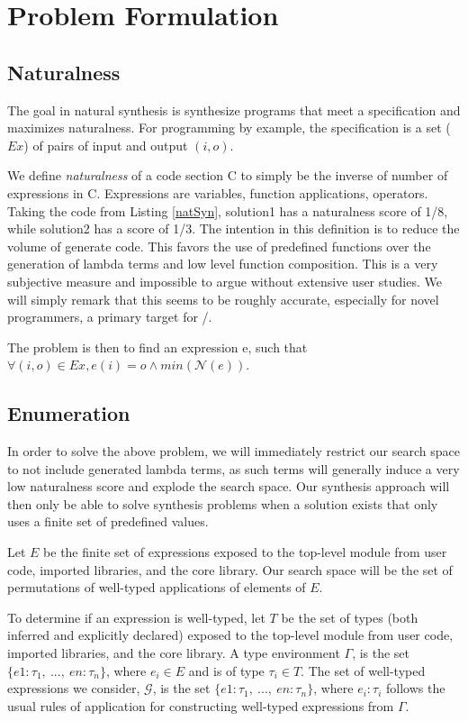 \section{Problem Formulation}
\label{problem}

\subsection{Naturalness}

The goal in natural synthesis is synthesize programs that meet a specification and maximizes naturalness.
For programming by example, the specification is a set ($Ex$) of pairs of input and output $(i,o)$.

We define \textit{naturalness} of a code section C to simply be the inverse of number of expressions in C.
Expressions are variables, function applications, operators.
Taking the code from Listing \ref{natSyn}, solution1 has a naturalness score of 1/8, while solution2 has a score of 1/3.
The intention in this definition is to reduce the volume of generate code.
This favors the use of predefined functions over the generation of lambda terms and low level function composition.
This is a very subjective measure and impossible to argue without extensive user studies.
We will simply remark that this seems to be roughly accurate, especially for novel programmers, a primary target for \ourTool/.

The problem is then to find an expression e, such that $\forall (i,o) \in Ex, e (i) = o \land min(\mathcal{N}(e))$.


\subsection{Enumeration}
In order to solve the above problem, we will immediately restrict our search space to not include generated lambda terms, as such terms will generally induce a very low naturalness score and explode the search space.
Our synthesis approach will then only be able to solve synthesis problems when a solution exists that only uses a finite set of predefined values.

Let $E$ be the finite set of expressions exposed to the top-level module from user code, imported libraries, and the core library.
Our search space will be the set of permutations of well-typed applications of elements of $E$.

To determine if an expression is well-typed, let $T$ be the set of types (both inferred and explicitly declared) exposed to the top-level module from user code, imported libraries, and the core library.
A type environment $\Gamma$, is the set $\{e1 : \tau_1,\ ...,\ en : \tau_n\}$, where $e_{i} \in E$ and is of type $\tau_i \in T$.
The set of well-typed expressions we consider, $\mathcal{G}$, is the set $\{e1 : \tau_1,\ ...,\ en : \tau_n\}$, where $e_i : \tau_i$ follows the usual rules of application for constructing well-typed expressions from $\Gamma$. 

